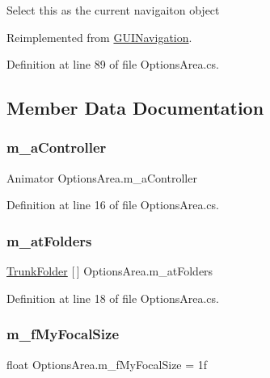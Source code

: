 Select this as the current navigaiton object 



Reimplemented from \mbox{\hyperlink{class_g_u_i_navigation_a4c40fc7986ac35247bc8f77c615e7847}{G\+U\+I\+Navigation}}.



Definition at line 89 of file Options\+Area.\+cs.



\subsection{Member Data Documentation}
\mbox{\label{class_options_area_a7598d72d506cdca00f7d5882a315464c}} 
\subsubsection{\texorpdfstring{m\+\_\+a\+Controller}{m\_aController}}
{\footnotesize\ttfamily Animator Options\+Area.\+m\+\_\+a\+Controller}



Definition at line 16 of file Options\+Area.\+cs.

\mbox{\label{class_options_area_aef24a9270c1caae2bbced4f6987dda0a}} 
\subsubsection{\texorpdfstring{m\+\_\+at\+Folders}{m\_atFolders}}
{\footnotesize\ttfamily \mbox{\hyperlink{class_trunk_folder}{Trunk\+Folder}} \mbox{[}$\,$\mbox{]} Options\+Area.\+m\+\_\+at\+Folders}



Definition at line 18 of file Options\+Area.\+cs.

\mbox{\label{class_options_area_a2c57b5d9bc4ef6dae87e98a5c5c31de6}} 
\subsubsection{\texorpdfstring{m\+\_\+f\+My\+Focal\+Size}{m\_fMyFocalSize}}
{\footnotesize\ttfamily float Options\+Area.\+m\+\_\+f\+My\+Focal\+Size = 1f}



